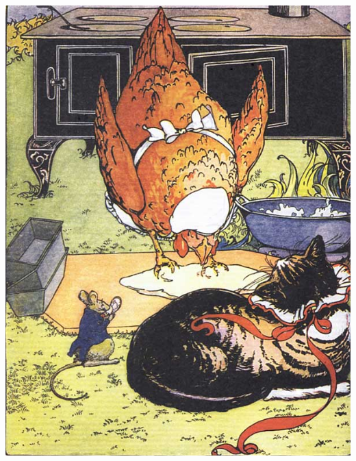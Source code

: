 \documentclass[letterpaper, 10pt, openany]{memoir}
\begin{document}
\newpage
\begin{center}
	\includegraphics[width=\textwidth]{image_052_1.jpg}
\end{center}
\end{document}
